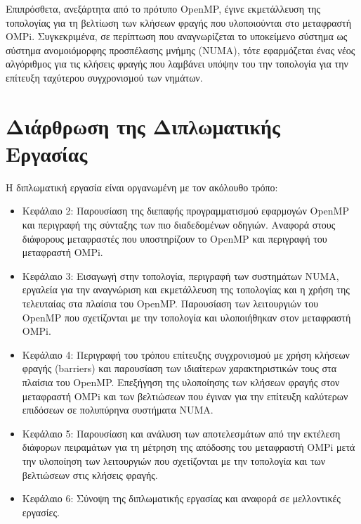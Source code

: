 Επιπρόσθετα, ανεξάρτητα από το πρότυπο OpenMP, έγινε εκμετάλλευση της τοπολογίας για τη βελτίωση των κλήσεων φραγής που υλοποιούνται στο μεταφραστή OMPi. Συγκεκριμένα, σε περίπτωση που αναγνωρίζεται το υποκείμενο σύστημα ως σύστημα ανομοιόμορφης προσπέλασης μνήμης (NUMA), τότε εφαρμόζεται ένας νέος αλγόριθμος για τις κλήσεις φραγής που λαμβάνει υπόψην του την τοπολογία για την επίτευξη ταχύτερου συγχρονισμού των νημάτων.


\section{Διάρθρωση της Διπλωματικής Εργασίας}
\label{sec:Structure of the Diploma Thesis}
Η διπλωματική εργασία είναι οργανωμένη με τον ακόλουθο τρόπο:
\begin{itemize}
	\item Κεφάλαιο 2: Παρουσίαση της διεπαφής προγραμματισμού εφαρμογών OpenMP και περιγραφή της σύνταξης των πιο διαδεδομένων οδηγιών. %
	Αναφορά στους διάφορους μεταφραστές που υποστηρίζουν το OpenMP και περιγραφή του μεταφραστή OMPi.
	\item Κεφάλαιο 3: Εισαγωγή στην τοπολογία, περιγραφή των συστημάτων NUMA, εργαλεία για την αναγνώριση και εκμετάλλευση της τοπολογίας και η χρήση της τελευταίας στα πλαίσια του OpenMP. Παρουσίαση των λειτουργιών του OpenMP που σχετίζονται με την τοπολογία και υλοποιήθηκαν στον μεταφραστή OMPi.
	\item Κεφάλαιο 4: Περιγραφή του τρόπου επίτευξης συγχρονισμού με χρήση κλήσεων φραγής (barriers) και παρουσίαση των ιδιαίτερων χαρακτηριστικών τους στα πλαίσια του OpenMP. Επεξήγηση της υλοποίησης των κλήσεων φραγής στον μεταφραστή OMPi και των βελτιώσεων που έγιναν για την επίτευξη καλύτερων επιδόσεων σε πολυπύρηνα συστήματα NUMA.
	\item Κεφάλαιο 5: Παρουσίαση και ανάλυση των αποτελεσμάτων από την εκτέλεση διάφορων πειραμάτων για τη μέτρηση της απόδοσης του μεταφραστή OMPi μετά την υλοποίηση των λειτουργιών που σχετίζονται με την τοπολογία και των βελτιώσεων στις κλήσεις φραγής.
	\item Κεφάλαιο 6: Σύνοψη της διπλωματικής εργασίας και αναφορά σε μελλοντικές εργασίες.
\end{itemize}

